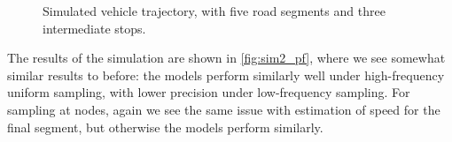 \begin{knitrout}\small
{}\color{fgcolor}\begin{figure}
\newline
{}
\caption[Simulated vehicle trajectory, with five road segments and three intermediate stops]{Simulated vehicle trajectory, with five road segments and three intermediate stops.}\label{fig:sim2_graph}
\end{figure}


\end{knitrout}


The results of the simulation are shown in \cref{fig:sim2_pf}, where we see somewhat similar results to before: the models perform similarly well under high-frequency uniform sampling, with lower precision under low-frequency sampling. For sampling at nodes, again we see the same issue with estimation of speed for the final segment, but otherwise the models perform similarly.

